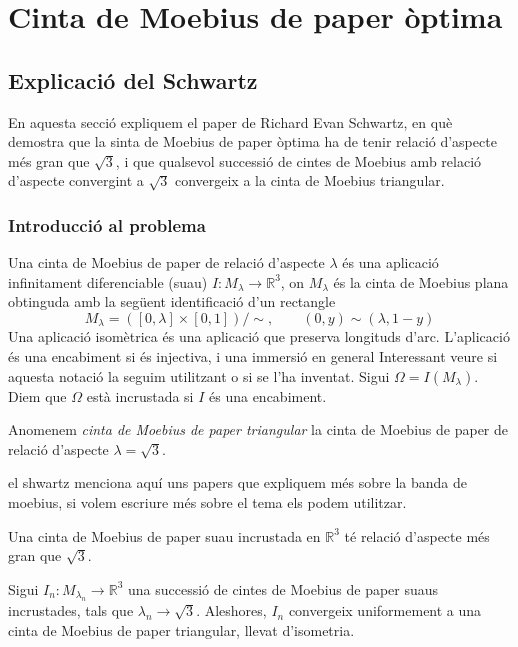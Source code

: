 \chapter{Cinta de Moebius de paper òptima}
\section{Explicació del Schwartz}
{\color{blue}En aquesta secció expliquem el paper de Richard Evan Schwartz, en què demostra que la sinta de Moebius de paper òptima ha de tenir relació d'aspecte més gran que $\sqrt{3}$, i que qualsevol successió de cintes de Moebius amb relació d'aspecte convergint a $\sqrt{3}$ convergeix a la cinta de Moebius triangular.}
\subsection{Introducció al problema}
\begin{defi}
    Una {\normalfont cinta de Moebius de paper de relació d'aspecte $\lambda$} és una aplicació infinitament diferenciable (suau) $I:M_{\lambda}\to\mathbb R^3$, on $M_\lambda$ és la cinta de Moebius plana obtinguda amb la següent identificació d'un rectangle
    $$M_\lambda = ([0,\lambda] \times [0,1])/\sim, \quad\quad (0,y)\sim(\lambda,1-y)$$
Una {\normalfont aplicació isomètrica} és una aplicació que preserva longituds d'arc. L'aplicació és una {\normalfont encabiment} si és injectiva, i una {\normalfont immersió} en general {\color{blue} Interessant veure si aquesta notació la seguim utilitzant o si se l'ha inventat}. Sigui $\Omega=I(M_\lambda)$. Diem que $\Omega$ està {\normalfont incrustada} si $I$ és una encabiment. 
\end{defi}
\begin{ex}
    Anomenem \textit{cinta de Moebius de paper triangular} la cinta de Moebius de paper de relació d'aspecte $\lambda = \sqrt{3}$.
\end{ex}
{\color{blue} el shwartz menciona aquí uns papers que expliquem més sobre la banda de moebius, si volem escriure més sobre el tema els podem utilitzar.}

\begin{teo}[Principal]\label{teo:Main Schwartz}
    Una cinta de Moebius de paper suau incrustada en $\mathbb R^3$ té relació d'aspecte més gran que $\sqrt{3}$.
\end{teo}

\begin{teo}\label{teo:Límit triangular}
    Sigui $I_n:M_{\lambda_n}\to\mathbb R^3$ una successió de cintes de Moebius de paper suaus incrustades, tals que $\lambda_n\to\sqrt{3}$. Aleshores, $I_n$ convergeix uniformement a una cinta de Moebius de paper triangular, llevat d'isometria.
\end{teo}
